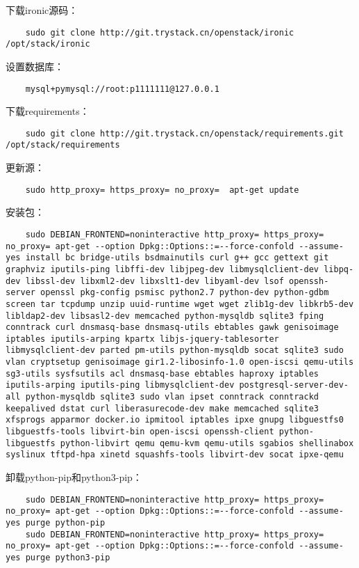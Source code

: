 \documentclass[a4paper,left=1.5cm,right=1.5cm,11pt]{article}
\begin{document}
	下载ironic源码：
	\begin{lstlisting}
	sudo git clone http://git.trystack.cn/openstack/ironic /opt/stack/ironic
	\end{lstlisting}

	设置数据库：
	\begin{lstlisting}
	mysql+pymysql://root:p1111111@127.0.0.1
	\end{lstlisting}

	下载requirements：
	\begin{lstlisting}
	sudo git clone http://git.trystack.cn/openstack/requirements.git /opt/stack/requirements
	\end{lstlisting}

	更新源：
	\begin{lstlisting}
	sudo http_proxy= https_proxy= no_proxy=  apt-get update
	\end{lstlisting}

	安装包：
	\begin{lstlisting}
	sudo DEBIAN_FRONTEND=noninteractive http_proxy= https_proxy= no_proxy= apt-get --option Dpkg::Options::=--force-confold --assume-yes install bc bridge-utils bsdmainutils curl g++ gcc gettext git graphviz iputils-ping libffi-dev libjpeg-dev libmysqlclient-dev libpq-dev libssl-dev libxml2-dev libxslt1-dev libyaml-dev lsof openssh-server openssl pkg-config psmisc python2.7 python-dev python-gdbm screen tar tcpdump unzip uuid-runtime wget wget zlib1g-dev libkrb5-dev libldap2-dev libsasl2-dev memcached python-mysqldb sqlite3 fping conntrack curl dnsmasq-base dnsmasq-utils ebtables gawk genisoimage iptables iputils-arping kpartx libjs-jquery-tablesorter libmysqlclient-dev parted pm-utils python-mysqldb socat sqlite3 sudo vlan cryptsetup genisoimage gir1.2-libosinfo-1.0 open-iscsi qemu-utils sg3-utils sysfsutils acl dnsmasq-base ebtables haproxy iptables iputils-arping iputils-ping libmysqlclient-dev postgresql-server-dev-all python-mysqldb sqlite3 sudo vlan ipset conntrack conntrackd keepalived dstat curl liberasurecode-dev make memcached sqlite3 xfsprogs apparmor docker.io ipmitool iptables ipxe gnupg libguestfs0 libguestfs-tools libvirt-bin open-iscsi openssh-client python-libguestfs python-libvirt qemu qemu-kvm qemu-utils sgabios shellinabox syslinux tftpd-hpa xinetd squashfs-tools libvirt-dev socat ipxe-qemu
	\end{lstlisting}

	卸载python-pip和python3-pip：
	\begin{lstlisting}
	sudo DEBIAN_FRONTEND=noninteractive http_proxy= https_proxy= no_proxy= apt-get --option Dpkg::Options::=--force-confold --assume-yes purge python-pip
	sudo DEBIAN_FRONTEND=noninteractive http_proxy= https_proxy= no_proxy= apt-get --option Dpkg::Options::=--force-confold --assume-yes purge python3-pip
	\end{lstlisting}
\end{document}
